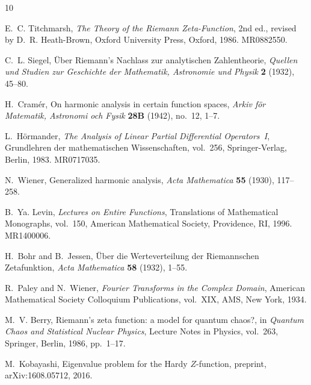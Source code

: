 \documentclass[12pt]{amsart}
\theoremstyle{definition}
\theoremstyle{remark}
\begin{document}
\begin{thebibliography}{10}

E.~C. Titchmarsh,
\textit{The Theory of the Riemann Zeta-Function},
2nd ed., revised by D.~R. Heath-Brown,
Oxford University Press, Oxford, 1986.
MR0882550.

C.~L. Siegel,
\"{U}ber Riemann's Nachlass zur analytischen Zahlentheorie,
\textit{Quellen und Studien zur Geschichte der Mathematik, Astronomie und
Physik} \textbf{2} (1932), 45--80.

H.~Cram\'{e}r,
On harmonic analysis in certain function spaces,
\textit{Arkiv f\"{o}r Matematik, Astronomi och Fysik}
\textbf{28B} (1942), no.~12, 1--7.

L.~H\"{o}rmander,
\textit{The Analysis of Linear Partial Differential Operators~I},
Grundlehren der mathematischen Wissenschaften, vol.~256,
Springer-Verlag, Berlin, 1983.
MR0717035.

N.~Wiener,
Generalized harmonic analysis,
\textit{Acta Mathematica} \textbf{55} (1930), 117--258.

B.~Ya. Levin,
\textit{Lectures on Entire Functions},
Translations of Mathematical Monographs, vol.~150,
American Mathematical Society, Providence, RI, 1996.
MR1400006.

H.~Bohr and B.~Jessen,
\"{U}ber die Werteverteilung der Riemannschen Zetafunktion,
\textit{Acta Mathematica} \textbf{58} (1932), 1--55.

R.~Paley and N.~Wiener,
\textit{Fourier Transforms in the Complex Domain},
American Mathematical Society Colloquium Publications, vol.~XIX,
AMS, New York, 1934.

M.~V. Berry,
Riemann's zeta function: a model for quantum chaos?,
in \textit{Quantum Chaos and Statistical Nuclear Physics},
Lecture Notes in Physics, vol.~263,
Springer, Berlin, 1986, pp.~1--17.

M.~Kobayashi,
Eigenvalue problem for the Hardy $Z$-function,
preprint, arXiv:1608.05712, 2016.

\end{thebibliography}
\end{document}
